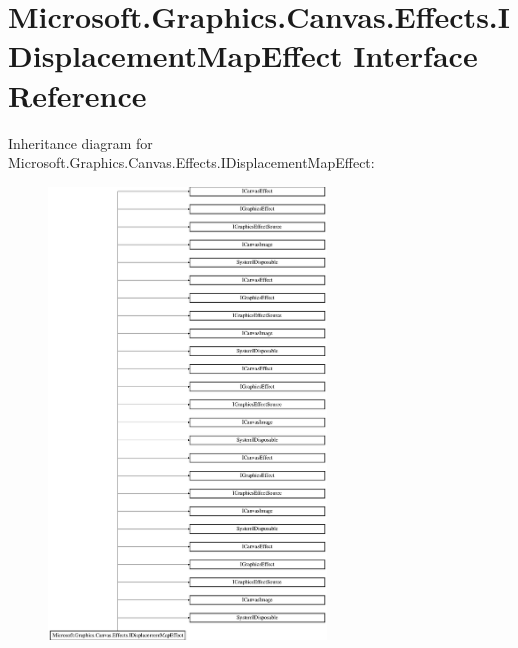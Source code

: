 \hypertarget{interface_microsoft_1_1_graphics_1_1_canvas_1_1_effects_1_1_i_displacement_map_effect}{}\section{Microsoft.\+Graphics.\+Canvas.\+Effects.\+I\+Displacement\+Map\+Effect Interface Reference}
\label{interface_microsoft_1_1_graphics_1_1_canvas_1_1_effects_1_1_i_displacement_map_effect}
Inheritance diagram for Microsoft.\+Graphics.\+Canvas.\+Effects.\+I\+Displacement\+Map\+Effect\+:\begin{figure}[H]
\begin{center}
\leavevmode
\includegraphics[height=12.000000cm]{interface_microsoft_1_1_graphics_1_1_canvas_1_1_effects_1_1_i_displacement_map_effect}
\end{center}
\end{figure}
